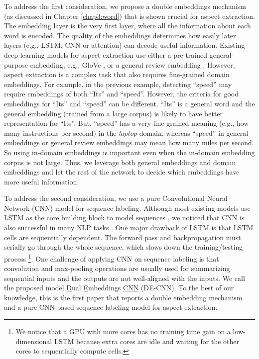 To address the first consideration, we propose a double embeddings mechanism (as discussed in Chapter \ref{chap3:word}) that is shown crucial for aspect extraction.
The embedding layer is the very first layer, where all the information about each word is encoded.
The quality of the embeddings determines how easily later layers (e.g., LSTM, CNN or attention) can decode useful information.
Existing deep learning models for aspect extraction use either a pre-trained general-purpose embedding, e.g., GloVe \cite{pennington2014glove}, or a general review embedding \cite{poria2016aspect}.
However, aspect extraction is a complex task that also requires fine-grained domain embeddings.
For example, in the previous example, detecting ``speed'' may require embeddings of both ``Its'' and ``speed''.
However, the criteria for good embeddings for ``Its'' and ``speed'' can be different.
``Its'' is a general word and the general embedding (trained from a large corpus) is likely to have better representation for ``Its''.
But, ``speed'' has a very fine-grained meaning (e.g., how many instructions per second) in the \textit{laptop} domain, whereas ``speed'' in general embeddings or general review embeddings may mean how many miles per second.
So using in-domain embeddings is important even when the in-domain embedding corpus is not large. 
Thus, we leverage both general embeddings and domain embeddings and let the rest of the network to decide which embeddings have more useful information.

To address the second consideration, we use a pure Convolutional Neural Network (CNN) \cite{lecun1995convolutional} model for sequence labeling.
Although most existing models use LSTM \cite{hochreiter1997long} as the core building block to model sequences \cite{liu2015fine,li2017deep}, we noticed that CNN is also successful in many NLP tasks \cite{kim2014convolutional,zhang2015character,gehring2017convolutional}.
One major drawback of LSTM is that LSTM cells are sequentially dependent.
The forward pass and backpropagation must serially go through the whole sequence, which slows down the training/testing process
\footnote{We notice that a GPU with more cores has no training time gain on a low-dimensional LSTM because extra cores are idle and waiting for the other cores to sequentially compute cells.}.
One challenge of applying CNN on sequence labeling is that convolution and max-pooling operations are usually used for summarizing sequential inputs and the outputs are not well-aligned with the inputs. %
We call the proposed model \underline{D}ual \underline{E}mbeddings \underline{CNN} (DE-CNN).
To the best of our knowledge, this is the first paper that reports a double embedding mechanism and a pure CNN-based sequence labeling model for aspect extraction.

